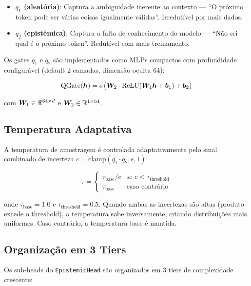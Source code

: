 \begin{itemize}
    \item \textbf{$q_1$ (aleat\'oria)}: Captura a ambiguidade inerente ao
    contexto --- ``O pr\'oximo token pode ser v\'arias coisas igualmente
    v\'alidas''. Irredut\'ivel por mais dados.

    \item \textbf{$q_2$ (epist\^emica)}: Captura a falta de conhecimento do
    modelo --- ``N\~ao sei qual \'e o pr\'oximo token''. Redut\'ivel com mais
    treinamento.
\end{itemize}

Os gates $q_1$ e $q_2$ s\~ao implementados como MLPs compactos com
profundidade configur\'avel (default 2 camadas, dimens\~ao oculta 64):

\begin{equation}
    \text{QGate}(\bm{h}) = \sigma\big(\bm{W}_2 \cdot \text{ReLU}(\bm{W}_1 \bm{h} + \bm{b}_1) + \bm{b}_2\big)
\end{equation}

com $\bm{W}_1 \in \mathbb{R}^{64 \times d}$ e $\bm{W}_2 \in \mathbb{R}^{1 \times 64}$.

\subsection{Temperatura Adaptativa}

A temperatura de amostragem \'e controlada adaptativamente pelo sinal
combinado de incerteza $c = \text{clamp}(q_1 \cdot q_2, \epsilon, 1)$:

\begin{equation}
    \tau = \begin{cases}
        \tau_{\text{base}} / c & \text{se } c < \tau_{\text{threshold}} \\
        \tau_{\text{base}} & \text{caso contr\'ario}
    \end{cases}
\end{equation}

onde $\tau_{\text{base}} = 1.0$ e $\tau_{\text{threshold}} = 0.5$.
Quando ambas as incertezas s\~ao altas (produto excede o threshold),
a temperatura sobe inversamente, criando distribui\c{c}\~oes mais uniformes.
Caso contr\'ario, a temperatura base \'e mantida.

\subsection{Organiza\c{c}\~ao em 3 Tiers}

Os sub-heads do \texttt{EpistemicHead} s\~ao organizados em 3 tiers de
complexidade crescente:

